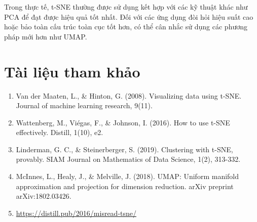 \documentclass[
]{article}
\begin{document}
Trong thực tế, t-SNE thường được sử dụng kết hợp với các kỹ thuật khác
như PCA để đạt được hiệu quả tốt nhất. Đối với các ứng dụng đòi hỏi hiệu
suất cao hoặc bảo toàn cấu trúc toàn cục tốt hơn, có thể cân nhắc sử
dụng các phương pháp mới hơn như UMAP.

\section{Tài liệu tham khảo}\label{tuxe0i-liux1ec7u-tham-khux1ea3o}

\begin{enumerate}
\def\labelenumi{\arabic{enumi}.}
\item
  Van der Maaten, L., \& Hinton, G. (2008). Visualizing data using
  t-SNE. Journal of machine learning research, 9(11).
\item
  Wattenberg, M., Viégas, F., \& Johnson, I. (2016). How to use t-SNE
  effectively. Distill, 1(10), e2.
\item
  Linderman, G. C., \& Steinerberger, S. (2019). Clustering with t-SNE,
  provably. SIAM Journal on Mathematics of Data Science, 1(2), 313-332.
\item
  McInnes, L., Healy, J., \& Melville, J. (2018). UMAP: Uniform manifold
  approximation and projection for dimension reduction. arXiv preprint
  arXiv:1802.03426.
\item
  \url{https://distill.pub/2016/misread-tsne/}
\end{enumerate}
\end{document}
